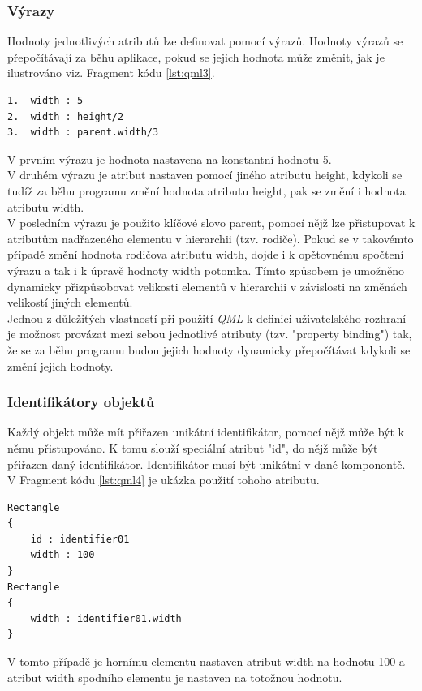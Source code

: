\documentclass[11pt,twoside,a4paper]{book}
\begin{document}
{{\begin{ttemize}
{{\subsubsection{Výrazy}
Hodnoty jednotlivých atributů lze definovat pomocí výrazů. Hodnoty výrazů se přepočítávají za běhu aplikace, pokud se jejich hodnota může změnit, jak je ilustrováno viz. Fragment kódu \ref{lst:qml3}.
\begin{lstlisting}[frame=single,caption=Několik ilustrativních příkladů formy výrazů.,label=lst:qml3]
1.	width : 5
2.	width : height/2
3.	width : parent.width/3
\end{lstlisting}
V prvním výrazu je hodnota nastavena na konstantní hodnotu 5.\\
V druhém výrazu je atribut nastaven pomocí jiného atributu height, kdykoli se tudíž za běhu programu změní hodnota atributu height, pak se změní i hodnota atributu width.\\
V posledním výrazu je použito klíčové slovo parent, pomocí nějž lze přistupovat k atributům nadřazeného elementu v hierarchii (tzv. rodiče). Pokud se v takovémto případě změní hodnota rodičova atributu width, dojde i k opětovnému spočtení výrazu a tak i k úpravě hodnoty width potomka. Tímto způsobem je umožněno dynamicky přizpůsobovat velikosti elementů v hierarchii v závislosti na změnách velikostí jiných elementů.\\
Jednou z důležitých vlastností při použití \textit{QML} k definici uživatelského rozhraní je možnost provázat mezi sebou jednotlivé atributy (tzv. "property binding") tak, že se za běhu programu budou jejich hodnoty dynamicky přepočítávat kdykoli se změní jejich hodnoty.

\subsubsection{Identifikátory objektů}
Každý objekt může mít přiřazen unikátní identifikátor, pomocí nějž může být k němu přistupováno.  K tomu slouží speciální atribut "id", do nějž může být přiřazen daný identifikátor. Identifikátor musí být unikátní v dané komponontě. V Fragment kódu \ref{lst:qml4} je ukázka použití tohoho atributu.
\begin{lstlisting}[frame=single,caption=Ukázka použití atributu id.,label=lst:qml4]
Rectangle
{
	id : identifier01
	width : 100
}
Rectangle
{
	width : identifier01.width
}
\end{lstlisting}
V tomto případě je hornímu elementu nastaven atribut width na hodnotu 100 a atribut width spodního elementu je nastaven na totožnou hodnotu.

}}
\end{ttemize}}}
\end{document}
